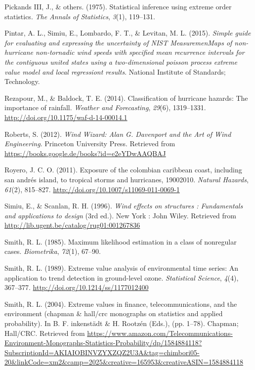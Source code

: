 \documentclass[12pt,twoside]{reedthesis}
\begin{document}
\leavevmode\hypertarget{ref-PickandsIII1975}{}%
Pickands III, J., \& others. (1975). Statistical inference using extreme order statistics. \emph{The Annals of Statistics}, \emph{3}(1), 119--131.

\leavevmode\hypertarget{ref-Pintar2015}{}%
Pintar, A. L., Simiu, E., Lombardo, F. T., \& Levitan, M. L. (2015). \emph{Simple guide for evaluating and expressing the uncertainty of NIST MeasuremenMaps of non-hurricane non-tornadic wind speeds with specified mean recurrence intervals for the contiguous united states using a two-dimensional poisson process extreme value model and local regressiont results}. National Institute of Standards; Technology.

\leavevmode\hypertarget{ref-Rezapour2014}{}%
Rezapour, M., \& Baldock, T. E. (2014). Classification of hurricane hazards: The importance of rainfall. \emph{Weather and Forecasting}, \emph{29}(6), 1319--1331. \url{http://doi.org/10.1175/waf-d-14-00014.1}

\leavevmode\hypertarget{ref-Roberts2012}{}%
Roberts, S. (2012). \emph{Wind Wizard: Alan G. Davenport and the Art of Wind Engineering}. Princeton University Press. Retrieved from \url{https://books.google.de/books?id=e2eYDwAAQBAJ}

\leavevmode\hypertarget{ref-Royero2011}{}%
Royero, J. C. O. (2011). Exposure of the colombian caribbean coast, including san andrés island, to tropical storms and hurricanes, 19002010. \emph{Natural Hazards}, \emph{61}(2), 815--827. \url{http://doi.org/10.1007/s11069-011-0069-1}

\leavevmode\hypertarget{ref-Simiu1996}{}%
Simiu, E., \& Scanlan, R. H. (1996). \emph{Wind effects on structures : Fundamentals and applications to design} (3rd ed.). New York : John Wiley. Retrieved from \url{http://lib.ugent.be/catalog/rug01:001267836}

\leavevmode\hypertarget{ref-Smith1985}{}%
Smith, R. L. (1985). Maximum likelihood estimation in a class of nonregular cases. \emph{Biometrika}, \emph{72}(1), 67--90.

\leavevmode\hypertarget{ref-Smith1989}{}%
Smith, R. L. (1989). Extreme value analysis of environmental time series: An application to trend detection in ground-level ozone. \emph{Statistical Science}, \emph{4}(4), 367--377. \url{http://doi.org/10.1214/ss/1177012400}

\leavevmode\hypertarget{ref-Smith2004}{}%
Smith, R. L. (2004). Extreme values in finance, telecommunications, and the environment (chapman \& hall/crc monographs on statistics and applied probability). In B. F. inkenstädt \& H. Rootzén (Eds.), (pp. 1--78). Chapman; Hall/CRC. Retrieved from \url{https://www.amazon.com/Telecommunications-Environment-Monographs-Statistics-Probability/dp/1584884118?SubscriptionId=AKIAIOBINVZYXZQZ2U3A\&tag=chimbori05-20\&linkCode=xm2\&camp=2025\&creative=165953\&creativeASIN=1584884118}
\end{document}
